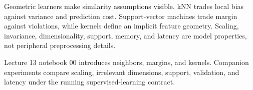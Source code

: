 \begin{chapterreview}
Geometric learners make similarity assumptions visible. kNN trades local bias
against variance and prediction cost. Support-vector machines trade margin
against violations, while kernels define an implicit feature geometry. Scaling,
invariance, dimensionality, support, memory, and latency are model properties,
not peripheral preprocessing details.
\end{chapterreview}

\begin{notebooklink}
Lecture 13 notebook 00 introduces neighbors, margins, and kernels. Companion
experiments compare scaling, irrelevant dimensions, support, validation, and
latency under the running supervised-learning contract.
\end{notebooklink}
